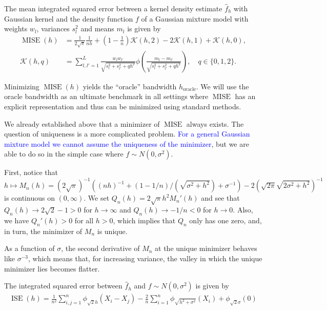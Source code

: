 \begin{Prop}
    The mean integrated squared error between a kernel density estimate $\hat{f}_h$ with Gaussian kernel and the density function $f$ of a Gaussian mixture model with weights $w_l$, variances $s_l^2$ and means $m_l$ is given by
    \begin{align*}
        \operatorname{MISE}(h)&=\frac{1}{2\sqrt{\pi}}\frac{1}{nh}+\left(1-\frac{1}{n}\right)\mathcal{K}(h,2)-2\mathcal{K}(h,1)+\mathcal{K}(h,0),\\
        \mathcal{K}(h,q)&=\sum_{l,l'=1}^{L}\frac{w_lw_{l'}}{\sqrt{s_l^2+s_{l'}^2+qh^2}}\phi\left(\frac{m_l-m_{l'}}{\sqrt{s_l^2+s_{l'}^2+qh^2}}\right),\quad q\in\{0,1,2\}.
    \end{align*}
\end{Prop}



Minimizing $\operatorname{MISE}(h)$ yields the \enquote{oracle} bandwidth $h_{\text{oracle}}$. We will use the oracle bandwidth as an ultimate benchmark in all settings where $\operatorname{MISE}$ has an explicit representation and thus can be minimized using standard methods.

We already established above that a minimizer of $\operatorname{MISE}$ always exists. The question of uniqueness is a more complicated problem. \textcolor{blue}{For a general Gaussian mixture model we cannot assume the uniqueness of the minimizer}, but we are able to do so in the simple case where $f\sim N(0,\sigma^2)$.

First, notice that $h\mapsto M_n(h)=(2\sqrt{\pi})^{-1}((nh)^{-1}+(1-1/n)/(\sqrt{\sigma^2+h^2})+\sigma^{-1})-2(\sqrt{2\pi}\sqrt{2\sigma^2+h^2})^{-1}$ is continuous on $(0,\infty)$. We set $Q_n(h)=2\sqrt{\pi}h^2M_n'(h)$ and see that $Q_n(h)\to2\sqrt{2}-1>0$ for $h\to\infty$ and $Q_n(h)\to-1/n<0$ for $h\to0$. Also, we have $Q_n'(h)>0$ for all $h>0$, which implies that $Q_n$ only has one zero, and, in turn, the minimizer of $M_n$ is unique.

As a function of $\sigma$, the second derivative of $M_n$ at the unique minimizer behaves like $\sigma^{-3}$, which means that, for increasing variance, the valley in which the unique minimizer lies becomes flatter.

The integrated squared error between $\hat{f}_h$ and $f\sim N(0,\sigma^2)$ is given by
\begin{align*}
    \operatorname{ISE}(h)=\frac{1}{n^2}\sum_{i,j=1}^{n}\phi_{\sqrt{2}h}(X_i-X_j)-\frac{2}{n}\sum_{i=1}^{n}\phi_{\sqrt{h^2+\sigma^2}}(X_i)+\phi_{\sqrt{2}\sigma}(0)
\end{align*}

